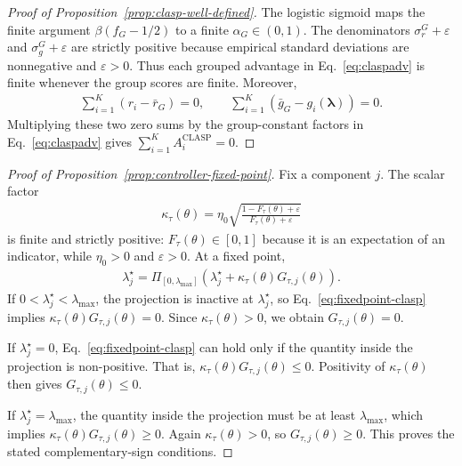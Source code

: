 \documentclass{article}
\theoremstyle{remark}
\begin{document}
\begin{proof}[Proof of Proposition~\ref{prop:clasp-well-defined}]
The logistic sigmoid maps the finite argument \(\beta(f_G-1/2)\) to a finite \(\alpha_G\in(0,1)\). The denominators \(\sigma_r^G+\varepsilon\) and \(\sigma_g^G+\varepsilon\) are strictly positive because empirical standard deviations are nonnegative and \(\varepsilon>0\). Thus each grouped advantage in Eq.~\eqref{eq:claspadv} is finite whenever the group scores are finite. Moreover,
\begin{align}
\sum_{i=1}^K (r_i-\bar r_G)=0,
\qquad
\sum_{i=1}^K (\bar g_G-g_i(\boldsymbol{\lambda}))=0.
\end{align}
Multiplying these two zero sums by the group-constant factors in Eq.~\eqref{eq:claspadv} gives \(\sum_{i=1}^K A_i^{\mathrm{CLASP}}=0\).
\end{proof}

\begin{proof}[Proof of Proposition~\ref{prop:controller-fixed-point}]
Fix a component \(j\). The scalar factor
\begin{align}
\kappa_\tau(\theta)=\eta_0 \sqrt{\frac{1-F_\tau(\theta)+\varepsilon}{F_\tau(\theta)+\varepsilon}}
\end{align}
is finite and strictly positive: \(F_\tau(\theta)\in[0,1]\) because it is an expectation of an indicator, while \(\eta_0>0\) and \(\varepsilon>0\). At a fixed point,
\begin{align}
\lambda_j^\star
=
\Pi_{[0,\lambda_{\max}]}
\left(
\lambda_j^\star + \kappa_\tau(\theta) G_{\tau,j}(\theta)
\right).
\label{eq:fixedpoint-clasp}
\end{align}
If \(0<\lambda_j^\star<\lambda_{\max}\), the projection is inactive at \(\lambda_j^\star\), so Eq.~\eqref{eq:fixedpoint-clasp} implies \(\kappa_\tau(\theta) G_{\tau,j}(\theta)=0\). Since \(\kappa_\tau(\theta)>0\), we obtain \(G_{\tau,j}(\theta)=0\).

If \(\lambda_j^\star=0\), Eq.~\eqref{eq:fixedpoint-clasp} can hold only if the quantity inside the projection is non-positive. That is, \(\kappa_\tau(\theta) G_{\tau,j}(\theta)\le 0\). Positivity of \(\kappa_\tau(\theta)\) then gives \(G_{\tau,j}(\theta)\le 0\).

If \(\lambda_j^\star=\lambda_{\max}\), the quantity inside the projection must be at least \(\lambda_{\max}\), which implies \(\kappa_\tau(\theta) G_{\tau,j}(\theta)\ge 0\). Again \(\kappa_\tau(\theta)>0\), so \(G_{\tau,j}(\theta)\ge 0\). This proves the stated complementary-sign conditions.
\end{proof}
\end{document}
